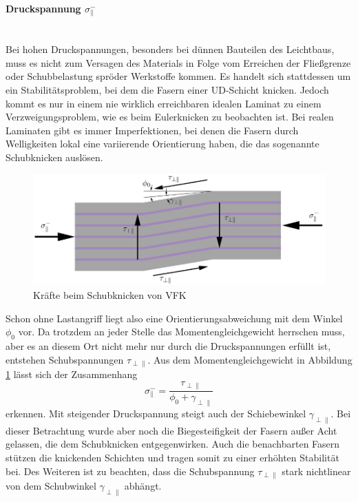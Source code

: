 \paragraph{Druckspannung $\sigma_{\parallel}^-$}~\\
Bei hohen Druckspannungen, besonders bei dünnen Bauteilen des Leichtbaus, muss es nicht zum Versagen des Materials in Folge vom Erreichen der Fließgrenze oder Schubbelastung spröder Werkstoffe kommen. Es handelt sich stattdessen um ein Stabilitätsproblem, bei dem die Fasern einer UD-Schicht knicken. Jedoch kommt es nur in einem nie wirklich erreichbaren idealen Laminat zu einem Verzweigungsproblem, wie es beim Eulerknicken zu beobachten ist. Bei realen Laminaten gibt es immer Imperfektionen, bei denen die Fasern durch Welligkeiten lokal eine variierende Orientierung haben, die das sogenannte Schubknicken auslösen.
\begin{figure}
	\includegraphics[width=1.0\textwidth]{Bilder/Schubknicken.png}
	\caption{Kräfte beim Schubknicken von VFK}
	\label{fig:Schubknicken}
\end{figure} 
Schon ohne Lastangriff liegt also eine Orientierungsabweichung mit dem Winkel $\phi_0$ vor. Da trotzdem an jeder Stelle das Momentengleichgewicht herrschen muss, aber es an diesem Ort nicht mehr nur durch die Druckspannungen erfüllt ist, entstehen Schubspannungen $\tau_{\perp\parallel}$. Aus dem Momentengleichgewicht in Abbildung \ref{fig:Schubknicken} lässt sich der Zusammenhang
\begin{equation}\label{SchubknickSigma}
	\sigma_{\parallel}^-=\frac{\tau_{\perp\parallel}}{\phi_0 + \gamma_{\perp\parallel}}
\end{equation}
erkennen. Mit steigender Druckspannung steigt auch der Schiebewinkel $\gamma_{\perp\parallel}$. Bei dieser Betrachtung wurde aber noch die Biegesteifigkeit der Fasern außer Acht gelassen, die dem Schubknicken entgegenwirken. Auch die benachbarten Fasern stützen die knickenden Schichten und tragen somit zu einer erhöhten Stabilität bei. Des Weiteren ist zu beachten, dass die Schubspannung $\tau_{\perp\parallel}$ stark nichtlinear von dem Schubwinkel $\gamma_{\perp\parallel}$ abhängt. 
